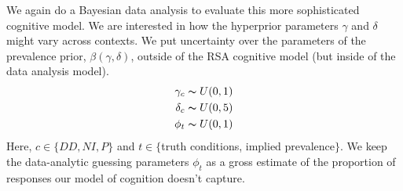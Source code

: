 \documentclass[10pt,letterpaper]{article}
\begin{document}
We again do a Bayesian data analysis to evaluate this more sophisticated cognitive model. We are interested in how the hyperprior parameters $\gamma$ and $\delta$ might vary across contexts.
We put uncertainty over the parameters of the prevalence prior, $\beta(\gamma,\delta)$, outside of the RSA cognitive model (but inside of the data analysis model). 
\begin{align*}
\gamma_{c} \thicksim U(0,1) \\
\delta_{c} \thicksim U(0,5) \\
\phi_{t} \thicksim U(0,1) 
\end{align*}
Here, $c \in \{DD,NI,P\}$ and $t \in \{$truth conditions, implied prevalence$\}$.
We keep the data-analytic guessing parameters $\phi_{t}$ as a gross estimate of the proportion of responses our model of cognition doesn't capture. 



%
%
%
%
%
\end{document}
